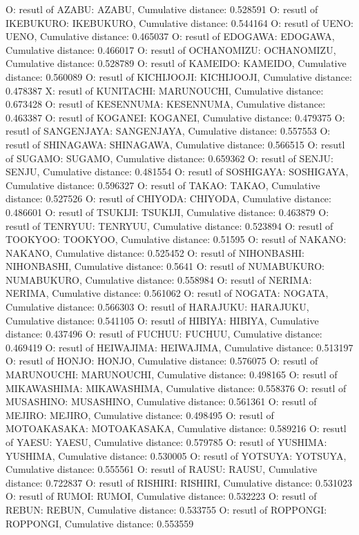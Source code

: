 O: resutl of AZABU: AZABU, Cumulative distance: 0.528591
O: resutl of IKEBUKURO: IKEBUKURO, Cumulative distance: 0.544164
O: resutl of UENO: UENO, Cumulative distance: 0.465037
O: resutl of EDOGAWA: EDOGAWA, Cumulative distance: 0.466017
O: resutl of OCHANOMIZU: OCHANOMIZU, Cumulative distance: 0.528789
O: resutl of KAMEIDO: KAMEIDO, Cumulative distance: 0.560089
O: resutl of KICHIJOOJI: KICHIJOOJI, Cumulative distance: 0.478387
X: resutl of KUNITACHI: MARUNOUCHI, Cumulative distance: 0.673428
O: resutl of KESENNUMA: KESENNUMA, Cumulative distance: 0.463387
O: resutl of KOGANEI: KOGANEI, Cumulative distance: 0.479375
O: resutl of SANGENJAYA: SANGENJAYA, Cumulative distance: 0.557553
O: resutl of SHINAGAWA: SHINAGAWA, Cumulative distance: 0.566515
O: resutl of SUGAMO: SUGAMO, Cumulative distance: 0.659362
O: resutl of SENJU: SENJU, Cumulative distance: 0.481554
O: resutl of SOSHIGAYA: SOSHIGAYA, Cumulative distance: 0.596327
O: resutl of TAKAO: TAKAO, Cumulative distance: 0.527526
O: resutl of CHIYODA: CHIYODA, Cumulative distance: 0.486601
O: resutl of TSUKIJI: TSUKIJI, Cumulative distance: 0.463879
O: resutl of TENRYUU: TENRYUU, Cumulative distance: 0.523894
O: resutl of TOOKYOO: TOOKYOO, Cumulative distance: 0.51595
O: resutl of NAKANO: NAKANO, Cumulative distance: 0.525452
O: resutl of NIHONBASHI: NIHONBASHI, Cumulative distance: 0.5641
O: resutl of NUMABUKURO: NUMABUKURO, Cumulative distance: 0.558984
O: resutl of NERIMA: NERIMA, Cumulative distance: 0.561062
O: resutl of NOGATA: NOGATA, Cumulative distance: 0.566303
O: resutl of HARAJUKU: HARAJUKU, Cumulative distance: 0.541105
O: resutl of HIBIYA: HIBIYA, Cumulative distance: 0.437496
O: resutl of FUCHUU: FUCHUU, Cumulative distance: 0.469419
O: resutl of HEIWAJIMA: HEIWAJIMA, Cumulative distance: 0.513197
O: resutl of HONJO: HONJO, Cumulative distance: 0.576075
O: resutl of MARUNOUCHI: MARUNOUCHI, Cumulative distance: 0.498165
O: resutl of MIKAWASHIMA: MIKAWASHIMA, Cumulative distance: 0.558376
O: resutl of MUSASHINO: MUSASHINO, Cumulative distance: 0.561361
O: resutl of MEJIRO: MEJIRO, Cumulative distance: 0.498495
O: resutl of MOTOAKASAKA: MOTOAKASAKA, Cumulative distance: 0.589216
O: resutl of YAESU: YAESU, Cumulative distance: 0.579785
O: resutl of YUSHIMA: YUSHIMA, Cumulative distance: 0.530005
O: resutl of YOTSUYA: YOTSUYA, Cumulative distance: 0.555561
O: resutl of RAUSU: RAUSU, Cumulative distance: 0.722837
O: resutl of RISHIRI: RISHIRI, Cumulative distance: 0.531023
O: resutl of RUMOI: RUMOI, Cumulative distance: 0.532223
O: resutl of REBUN: REBUN, Cumulative distance: 0.533755
O: resutl of ROPPONGI: ROPPONGI, Cumulative distance: 0.553559
